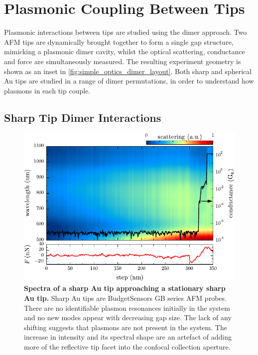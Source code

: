 \documentclass[a4paper]{article}
\begin{document}
\section{Plasmonic Coupling Between Tips}

Plasmonic interactions between tips are studied using the dimer approach. Two AFM tips are dynamically brought together to form a single gap structure, mimicking a plasmonic dimer cavity, whilst the optical scattering, conductance and force are simultaneously measured. The resulting experiment geometry is shown as an inset in \autoref{fig:simple_optics_dimer_layout}. Both sharp and spherical Au tips are studied in a range of dimer permutations, in order to understand how plasmons in each tip couple.

\subsection{Sharp Tip Dimer Interactions}

\begin{figure}[bt]
\centering
\includegraphics{figures/sharp_au_tip_dimer_scan}
\caption[Spectra of a sharp Au tip approaching a stationary sharp Au tip]{\textbf{Spectra of a sharp Au tip approaching a stationary sharp Au tip.} Sharp Au tips are BudgetSensors GB series AFM probes. There are no identifiable plasmon resonances initially in the system and no new modes appear with decreasing gap size. The lack of any shifting suggests that plasmons are not present in the system. The increase in intensity and its spectral shape are an artefact of adding more of the reflective tip facet into the confocal collection aperture.}
\label{fig:sharp_tip_scan}
\end{figure}
\end{document}

